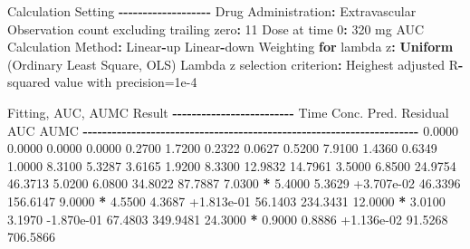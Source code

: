 \documentclass[
  10pt,
]{krantz}
\makeatletter
\newenvironment{Shaded}{\begin{snugshade}}{\end{snugshade}}
\newcommand{\ControlFlowTok}[1]{\textcolor[rgb]{0.13,0.29,0.53}{\textbf{#1}}}
\newcommand{\DecValTok}[1]{\textcolor[rgb]{0.00,0.00,0.81}{#1}}
\newcommand{\FloatTok}[1]{\textcolor[rgb]{0.00,0.00,0.81}{#1}}
\newcommand{\KeywordTok}[1]{\textcolor[rgb]{0.13,0.29,0.53}{\textbf{#1}}}
\newcommand{\NormalTok}[1]{#1}
\newcommand{\OperatorTok}[1]{\textcolor[rgb]{0.81,0.36,0.00}{\textbf{#1}}}
\newcommand{\StringTok}[1]{\textcolor[rgb]{0.31,0.60,0.02}{#1}}
\newenvironment{kframe}{%
\medskip{}
\setlength{\fboxsep}{.8em}
 \def\at@end@of@kframe{}%
 \ifinner\ifhmode%
  \def\at@end@of@kframe{\end{minipage}}%
  \begin{minipage}{\columnwidth}%
 \fi\fi%
 \def\FrameCommand##1{\hskip\@totalleftmargin \hskip-\fboxsep
 \colorbox{shadecolor}{##1}\hskip-\fboxsep
     \hskip-\linewidth \hskip-\@totalleftmargin \hskip\columnwidth}%
 \MakeFramed {\advance\hsize-\width
   \@totalleftmargin\z@ \linewidth\hsize
   \@setminipage}}%
 {\par\unskip\endMakeFramed%
 \at@end@of@kframe}
\renewenvironment{Shaded}{\begin{kframe}}{\end{kframe}}
\makeatother
\begin{document}
\begin{Shaded}
\begin{Highlighting}[]
\NormalTok{Calculation Setting}
\OperatorTok{{-}{-}{-}{-}{-}{-}{-}{-}{-}{-}{-}{-}{-}{-}{-}{-}{-}{-}{-}}
\NormalTok{Drug Administration}\OperatorTok{:}\StringTok{ }\NormalTok{Extravascular}
\NormalTok{Observation count excluding trailing zero}\OperatorTok{:}\StringTok{ }\DecValTok{11}
\NormalTok{Dose at time }\DecValTok{0}\OperatorTok{:}\StringTok{ }\DecValTok{320}\NormalTok{ mg}
\NormalTok{AUC Calculation Method}\OperatorTok{:}\StringTok{ }\NormalTok{Linear}\OperatorTok{{-}}\NormalTok{up Linear}\OperatorTok{{-}}\NormalTok{down}
\NormalTok{Weighting }\ControlFlowTok{for}\NormalTok{ lambda z}\OperatorTok{:}\StringTok{ }\KeywordTok{Uniform}\NormalTok{ (Ordinary Least Square, OLS)}
\NormalTok{Lambda z selection criterion}\OperatorTok{:}\StringTok{ }\NormalTok{Heighest adjusted R}\OperatorTok{{-}}\NormalTok{squared value with precision=}\FloatTok{1e{-}4}


\NormalTok{Fitting, AUC, AUMC Result}
\OperatorTok{{-}{-}{-}{-}{-}{-}{-}{-}{-}{-}{-}{-}{-}{-}{-}{-}{-}{-}{-}{-}{-}{-}{-}{-}{-}}
\StringTok{      }\NormalTok{Time         Conc.      Pred.   Residual       AUC       AUMC}
\OperatorTok{{-}{-}{-}{-}{-}{-}{-}{-}{-}{-}{-}{-}{-}{-}{-}{-}{-}{-}{-}{-}{-}{-}{-}{-}{-}{-}{-}{-}{-}{-}{-}{-}{-}{-}{-}{-}{-}{-}{-}{-}{-}{-}{-}{-}{-}{-}{-}{-}{-}{-}{-}{-}{-}{-}{-}{-}{-}{-}{-}{-}{-}{-}{-}{-}{-}{-}{-}{-}{-}}
\StringTok{     }\FloatTok{0.0000}       \FloatTok{0.0000}                           \FloatTok{0.0000}     \FloatTok{0.0000}
     \FloatTok{0.2700}       \FloatTok{1.7200}                           \FloatTok{0.2322}     \FloatTok{0.0627}
     \FloatTok{0.5200}       \FloatTok{7.9100}                           \FloatTok{1.4360}     \FloatTok{0.6349}
     \FloatTok{1.0000}       \FloatTok{8.3100}                           \FloatTok{5.3287}     \FloatTok{3.6165}
     \FloatTok{1.9200}       \FloatTok{8.3300}                          \FloatTok{12.9832}    \FloatTok{14.7961}
     \FloatTok{3.5000}       \FloatTok{6.8500}                          \FloatTok{24.9754}    \FloatTok{46.3713}
     \FloatTok{5.0200}       \FloatTok{6.0800}                          \FloatTok{34.8022}    \FloatTok{87.7887}
     \FloatTok{7.0300} \OperatorTok{*}\StringTok{     }\FloatTok{5.4000}     \FloatTok{5.3629} \FloatTok{+3.707e{-}02}    \FloatTok{46.3396}   \FloatTok{156.6147}
     \FloatTok{9.0000} \OperatorTok{*}\StringTok{     }\FloatTok{4.5500}     \FloatTok{4.3687} \FloatTok{+1.813e{-}01}    \FloatTok{56.1403}   \FloatTok{234.3431}
    \FloatTok{12.0000} \OperatorTok{*}\StringTok{     }\FloatTok{3.0100}     \FloatTok{3.1970} \FloatTok{{-}1.870e{-}01}    \FloatTok{67.4803}   \FloatTok{349.9481}
    \FloatTok{24.3000} \OperatorTok{*}\StringTok{     }\FloatTok{0.9000}     \FloatTok{0.8886} \FloatTok{+1.136e{-}02}    \FloatTok{91.5268}   \FloatTok{706.5866}


\end{Highlighting}
\end{Shaded}
\end{document}
